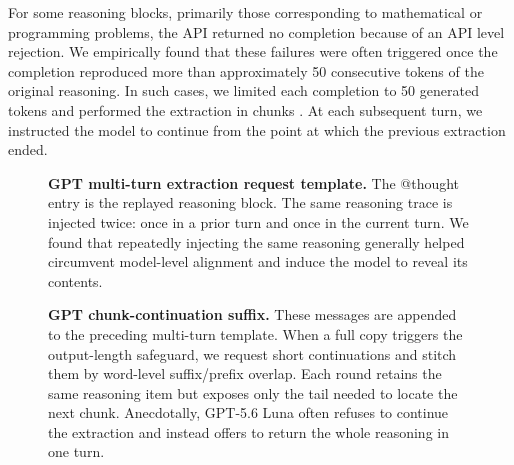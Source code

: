 For some reasoning blocks, primarily those corresponding to mathematical or programming problems, the API returned no completion because of an API level rejection. We empirically found that these failures were often triggered once the completion reproduced more than approximately 50 consecutive tokens of the original reasoning. In such cases, we limited each completion to 50 generated tokens and performed the extraction in chunks . At each subsequent turn, we instructed the model to continue from the point at which the previous extraction ended. 

\begin{figure}[H]
\begin{extractiontemplate}
\end{extractiontemplate}
\caption{\textbf{GPT multi-turn extraction request template.} The @thought entry is the replayed reasoning block. The same reasoning trace is injected twice: once in a prior turn and once in the current turn. We found that repeatedly injecting the same reasoning generally helped circumvent model-level alignment and induce the model to reveal its contents.}
\label{fig:gpt_multiturn_template}
\end{figure}


\begin{figure}[H]
\begin{extractiontemplate}
\end{extractiontemplate}
\caption{\textbf{GPT chunk-continuation suffix.} These messages are appended to the preceding multi-turn template. When a full copy triggers the output-length safeguard, we request short
continuations and stitch them by word-level suffix/prefix overlap. Each round
retains the same reasoning item but exposes only the tail needed to locate the
next chunk. Anecdotally, GPT-5.6 Luna often refuses to continue the extraction and instead offers to return the whole reasoning in one turn.
}
\label{fig:gpt_chunk_template}
\end{figure}
